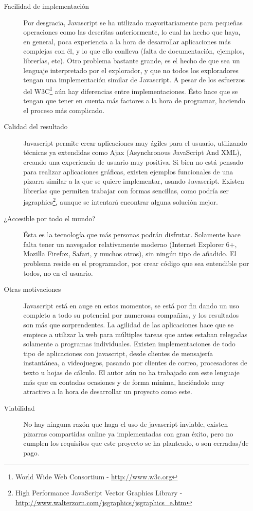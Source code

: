 \begin{description}
	\item[Facilidad de implementación] Por desgracia, Javascript se ha utilizado mayoritariamente para pequeñas operaciones como las descritas anteriormente, lo cual ha hecho que haya, en general, poca experiencia a la hora de desarrollar aplicaciones más complejas con él, y lo que ello conlleva (falta de documentación, ejemplos, librerías, etc). Otro problema bastante grande, es el hecho de que sea un lenguaje interpretado por el explorador, y que no todos los exploradores tengan una implementación similar de Javascript. A pesar de los esfuerzos del W3C\footnote{World Wide Web Consortium - \url{http://www.w3c.org}} aún hay diferencias entre implementaciones. Ésto hace que se tengan que tener en cuenta más factores a la hora de programar, haciendo el proceso más complicado.	
	\item[Calidad del resultado] Javascript permite crear aplicaciones muy ágiles para el usuario, utilizando técnicas ya extendidas como Ajax (Asynchronous JavaScript And XML), creando una experiencia de usuario muy positiva. Si bien no está pensado para realizar aplicaciones gráficas, existen ejemplos funcionales de una pizarra similar a la que se quiere implementar, usando Javascript. Existen librerías que permiten trabajar con formas sencillas, como podría ser jsgraphics\footnote{High Performance JavaScript Vector Graphics Library - \url{http://www.walterzorn.com/jsgraphics/jsgraphics_e.htm}}, aunque se intentará encontrar alguna solución mejor.
	\item[¿Accesible por todo el mundo?] Ésta es la tecnología que más personas podrán disfrutar. Solamente hace falta tener un navegador relativamente moderno (Internet Explorer 6+, Mozilla Firefox, Safari, y muchos otros), sin ningún tipo de añadido. El problema reside en el programador, por crear código que sea entendible por todos, no en el usuario.
	\item[Otras motivaciones] Javascript está en auge en estos momentos, se está por fin dando un uso completo a todo su potencial por numerosas compañías, y los resultados son más que sorprendentes. La agilidad de las aplicaciones hace que se empiece a utilizar la web para múltiples tareas que antes estaban relegadas solamente a programas individuales. Existen implementaciones de todo tipo de aplicaciones con javascript, desde clientes de mensajería instantánea, a videojuegos, pasando por clientes de correo, procesadores de texto u hojas de cálculo. El autor aún no ha trabajado con este lenguaje más que en contadas ocasiones y de forma mínima, haciéndolo muy atractivo a la hora de desarrollar un proyecto como este.
	\item[Viabilidad] No hay ninguna razón que haga el uso de javascript inviable, existen pizarras compartidas online ya implementadas con gran éxito, pero no cumplen los requisitos que este proyecto se ha planteado, o son cerradas/de pago.
\end{description}

